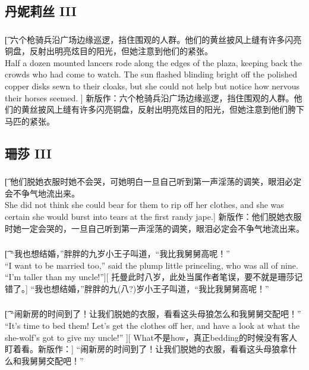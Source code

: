 \documentclass[12pt,a4paper]{article}
\begin{document}
\subsection{丹妮莉丝 III}
\subsubsection{}\t[
	六个枪骑兵沿广场边缘巡逻，挡住围观的人群。他们的黄丝披风上缝有许多闪亮铜盘，反射出明亮炫目的阳光，但她注意到他们的紧张。\\
	Half a dozen mounted lancers rode along the edges of the plaza, keeping back the crowds who had come to watch. The sun flashed blinding bright off the polished copper disks sewn to their cloaks, but she could not help but notice how nervous their horses seemed. ]
	新版作：六个枪骑兵沿广场边缘巡逻，挡住围观的人群。他们的黄丝披风上缝有许多闪亮铜盘，反射出明亮炫目的阳光，但她注意到他们胯下马匹的紧张。
	
\subsection{珊莎 III}
\subsubsection{}\t[
	他们脱她衣服时她不会哭，可她明白一旦自己听到第一声淫荡的调笑，眼泪必定会不争气地流出来。\\
	She did not think she could bear for them to rip off her clothes, and she was certain she would burst into tears at the first randy jape.]
	新版作：他们脱她衣服时她一定会哭的，一旦自己听到第一声淫荡的调笑，眼泪必定会不争气地流出来。
	
\subsubsection{}\t[
	“我也想结婚，”胖胖的九岁小王子叫道，“我比我舅舅高呢！”\\
	“I want to be married too,” said the plump little princeling, who was all of nine. “I'm taller than my uncle!”][
	托曼此时八岁，此处当属作者笔误，要不就是珊莎记错了。]
	“我也想结婚，”胖胖的九(八?)岁小王子叫道，“我比我舅舅高呢！”
	
\subsubsection{}\t[
	“闹新房的时间到了！让我们脱她的衣服，看看这头母狼怎么和我舅舅交配吧！” \\
	“It's time to bed them! Let's get the clothes off her, and have a look at what the she-wolf's got to give my uncle!” ][
	What不是how，真正bedding的时候没有客人盯着看。新版作：]
	“闹新房的时间到了！让我们脱她的衣服，看看这头母狼拿什么和我舅舅交配吧！”
	
\end{document}
